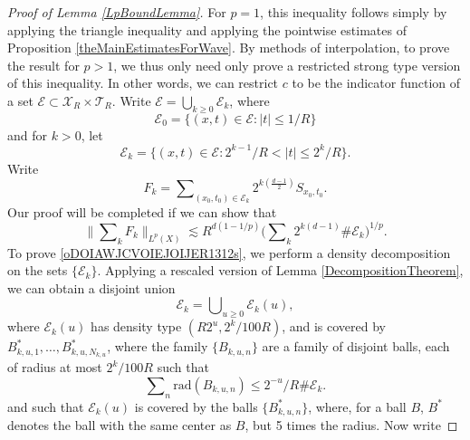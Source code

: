 \begin{proof}[Proof of Lemma \ref{LpBoundLemma}]

For $p = 1$, this inequality follows simply by applying the triangle inequality and applying the pointwise estimates of Proposition \ref{theMainEstimatesForWave}. By methods of interpolation, to prove the result for $p > 1$, we thus only need only prove a restricted strong type version of this inequality. In other words, we can restrict $c$ to be the indicator function of a set $\mathcal{E} \subset \mathcal{X}_R \times \mathcal{T}_R$. Write $\mathcal{E} = \bigcup_{k \geq 0} \mathcal{E}_k$, where
%
\begin{equation}
    \mathcal{E}_0 = \{ (x,t) \in \mathcal{E} : |t| \leq 1/R \}
\end{equation}
%
and for $k > 0$, let
%
\begin{equation}
    \mathcal{E}_k = \{ (x,t) \in \mathcal{E} : 2^{k-1} / R < |t| \leq 2^{k} / R \}.
\end{equation}
%
Write
%
\begin{equation}
    F_k = \sum\nolimits_{(x_0,t_0) \in \mathcal{E}_k} 2^{k \left( \frac{d-1}{2} \right)} S\!_{x_0,t_0}.
\end{equation}
%
Our proof will be completed if we can show that
%
\begin{equation} \label{oDOIAWJCVOIEJOIJER1312s}
    \Big\| \sum\nolimits_k F_k \Big\|_{L^p(X)} \lesssim R^{d ( 1 - 1/p )} \Big( \sum\nolimits_k 2^{k(d-1)} \# \mathcal{E}_k \Big)^{1/p}.
\end{equation}
%
To prove \eqref{oDOIAWJCVOIEJOIJER1312s}, we perform a density decomposition on the sets $\{ \mathcal{E}_k \}$. Applying a rescaled version of Lemma \ref{DecompositionTheorem}, we can obtain a disjoint union
%
\begin{equation}
    \mathcal{E}_k = \bigcup\nolimits_{u \geq 0} \mathcal{E}_k(u),
\end{equation}
%
where $\mathcal{E}_k(u)$ has density type $(R 2^{u}, 2^{k} / 100 R)$, and is covered by $B_{k,u,1}^*,\dots,B_{k,u,N_{k,u}}^*$, where the family $\{ B_{k,u,n} \}$ are a family of disjoint balls, each of radius at most $2^{k} / 100 R$ such that
%
\begin{equation}
    \sum\nolimits_n \text{rad}(B_{k,u,n}) \leq 2^{-u} / R \# \mathcal{E}_k.
\end{equation}
%
and such that $\mathcal{E}_k(u)$ is covered by the balls $\{ B_{k,u,n}^* \}$, where, for a ball $B$, $B^*$ denotes the ball with the same center as $B$, but 5 times the radius. Now write

\end{proof}
